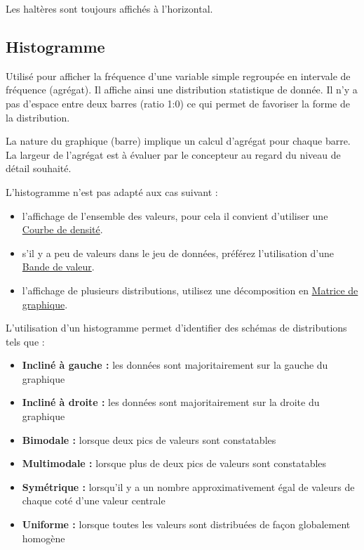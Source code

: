 \documentclass[a4paper,12pt]{article}
\begin{document}
\begin{multicols}{2}
Les haltères sont toujours affichés à l'horizontal.
\subsection*{Histogramme}
\label{sec:orgafa675a}
Utilisé pour afficher la fréquence d'une variable simple regroupée en intervale de fréquence (agrégat).\autocite{sosulskiGraphics2019} Il affiche ainsi une distribution statistique de donnée. Il n'y a pas d'espace entre deux barres (ratio 1:0) ce qui permet de favoriser la forme de la distribution. \autocite{alansmithLexiqueVisuel}

La nature du graphique (barre) implique un calcul d'agrégat pour chaque barre. \autocite{wilkeVisualizingDistributionsHistograms2019} La largeur de l'agrégat est à évaluer par le concepteur au regard du niveau de détail souhaité.\autocite{wilkeVisualizingDistributionsHistograms2019}

L'histogramme n'est pas adapté aux cas suivant :
\begin{itemize}
\item l'affichage de l'ensemble des valeurs, pour cela il convient d'utiliser une \hyperref[sec:org4be834f]{Courbe de densité}. \autocite{wilkeVisualizingDistributionsHistograms2019}
\item s'il y a peu de valeurs dans le jeu de données, \autocite{weissgerberBarLineGraphs2015} préférez l'utilisation d'une \hyperref[sec:org371b21a]{Bande de valeur}.
\item l'affichage de plusieurs distributions,\autocite{wilkeVisualizingDistributionsHistograms2019} utilisez une décomposition en \hyperref[sec:org9f8620b]{Matrice de graphique}.
\end{itemize}

L'utilisation d'un histogramme permet d'identifier des schémas de distributions tels que : \autocite{jonathanschwabishDistribution2021}
\begin{itemize}
\item \textbf{Incliné à gauche :} les données sont majoritairement sur la gauche du graphique
\item \textbf{Incliné à droite :} les données sont majoritairement sur la droite du graphique
\item \textbf{Bimodale :} lorsque deux pics de valeurs sont constatables
\item \textbf{Multimodale :} lorsque plus de deux pics de valeurs sont constatables
\item \textbf{Symétrique :} lorsqu'il y a un nombre approximativement égal de valeurs de chaque coté d'une valeur centrale
\item \textbf{Uniforme :} lorsque toutes les valeurs sont distribuées de façon globalement homogène
\end{itemize}

\end{multicols}
\end{document}
